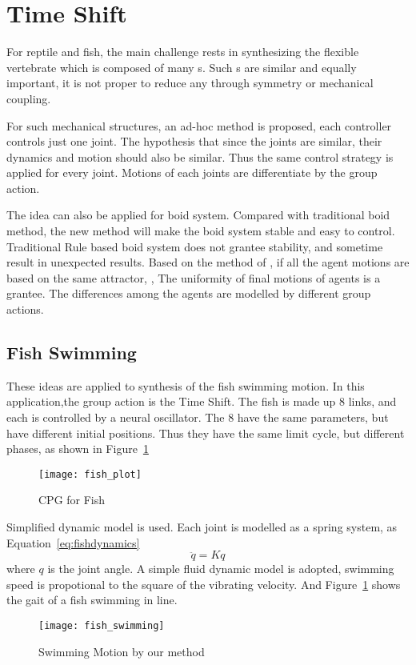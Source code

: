 {\section{Time Shift}

For reptile and fish, the main challenge rests in synthesizing the flexible vertebrate which is composed of many {\dof}s.
Such {\dof}s are similar and equally important, it is not proper to reduce any \dof through symmetry or mechanical coupling.

For such mechanical structures, an ad-hoc method is proposed, each controller controls just one joint.
The hypothesis that since the joints are similar, their dynamics and motion should also be similar.
Thus the same control strategy is applied for every joint.
Motions of each joints are differentiate by the group action.


The idea can also be applied for boid system\citep{reynolds1987flocks}.
Compared with traditional boid method, the new method will make the boid system stable and easy to control.
Traditional Rule based boid system does not grantee stability, and sometime result in unexpected results.
Based on the method of \moit, if all the agent motions are based on the same attractor, ,
The uniformity of final motions of agents is a grantee.
The differences  among the agents are modelled by different group actions.

\subsection*{Fish Swimming}
These ideas are applied to synthesis of the fish swimming motion.
In this application,the group action is the Time Shift.
The fish is made up 8 links, and each {\dof} is controlled by a neural oscillator.
The $8$ \cpg have the same parameters, but have different initial positions. 
Thus they have the same limit cycle, but different phases, as shown in Figure~\ref{fig:fishplot}



\begin{figure}[!htbp]
  \begin{center}
      \texttt{[image: fish\_plot]}
    \caption{CPG for Fish}
    \label{fig:fishplot}
\end{center}
\end{figure}




Simplified dynamic model is used.
Each joint is modelled as a spring system, as Equation~\ref{eq:fishdynamics}
\begin{equation}
\label{eq:fishdynamics}
\ddot{q}=Kq
\end{equation}
where $q$ is the joint angle.
A simple fluid dynamic model is adopted,  swimming speed is propotional to the square of the vibrating velocity.
And Figure~\ref{} shows the gait of a fish swimming in line.
\begin{figure}[!htbp]
  \begin{center}
      \texttt{[image: fish\_swimming]}
    \caption{Swimming Motion by our method}
    \label{fig:fishswimming}
\end{center}
\end{figure}


}
